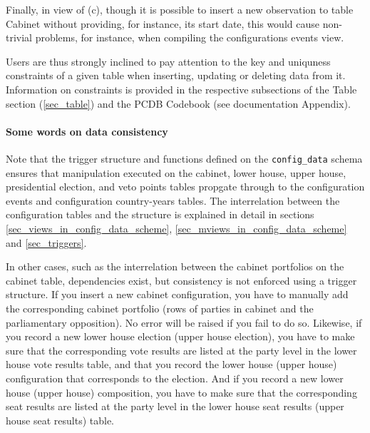 Finally, in view of (c), though it is possible to insert a new observation to table Cabinet without providing, for instance, its start date, this would cause non-trivial problems, for instance, when compiling the configurations events view.

Users are thus strongly inclined to pay attention to the key and uniquness constraints of a given table when inserting, updating or deleting data from it. Information on constraints is provided in the respective subsections of the Table section (\ref{sec_table}) and the PCDB Codebook (see documentation Appendix).

\paragraph{Some words on data consistency}

Note that the trigger structure and functions defined on the \texttt{config\_data} schema ensures that manipulation executed on the cabinet, lower house, upper house, presidential election, and veto points tables propgate through to the configuration events and configuration country-years tables.
The interrelation between the configuration tables and the structure is explained in detail in sections \ref{sec_views_in_config_data_scheme}, \ref{sec_mviews_in_config_data_scheme} and \ref{sec_triggers}.

In other cases, such as the interrelation between the cabinet portfolios on the cabinet table, dependencies exist, but consistency is not enforced using a trigger structure. If you insert a new cabinet configuration, you have to manually add the corresponding cabinet portfolio (rows of parties in cabinet and the parliamentary opposition). No error will be raised if you fail to do so.
Likewise, if you record a new lower house election (upper house election), you have to make sure that the corresponding vote results are listed at the party level in the lower house vote results table, and that you record the lower house (upper house) configuration that corresponds to the election.
And if you record a new lower house (upper house) composition, you have to make sure that the corresponding seat results are listed at the party level in the lower house seat results (upper house seat results) table. 


  
  
  
  